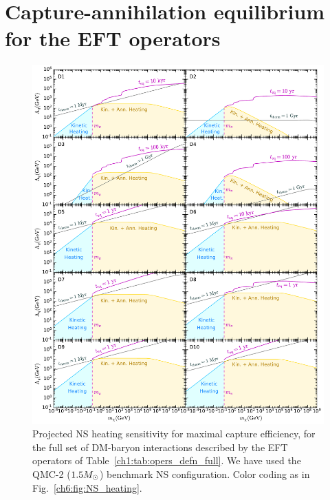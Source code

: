 \section{Capture-annihilation equilibrium for the EFT operators}
\label{app:sec:resultsEFTop}

\begin{figure}
    \centering
    \includegraphics[width=\textwidth]{img/thermalisation/ann_heat_sensitivity.pdf}    
    \caption[Projected NS heating sensitivity for maximal capture efficiency, for the full set of DM-baryon interactions described by the EFT operators of Table~\ref{ch1:tab:opers_defn_full}.]{Projected NS heating sensitivity for maximal capture efficiency, for the full set of DM-baryon interactions described by the EFT operators of Table~\ref{ch1:tab:opers_defn_full}. We have used the QMC-2 ($1.5M_\odot$) benchmark NS configuration.  
    Color coding as in Fig.~\ref{ch6:fig:NS_heating}. 
    }
    \label{app:fig:NS_heating2}
\end{figure}



